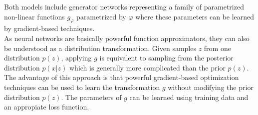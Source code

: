 
Both models include generator networks representing a family of parametrized non-linear functions $g_\varphi$ parametrized by $\varphi$ where these parameters can be learned by gradient-based techniques.\\
As neural networks are basically powerful function approximators, they can also be understood as a distribution transformation.
Given samples $z$ from one distribution $p(z)$, applying $g$ is equivalent to sampling from the posterior distribution $p(x|z)$ which is generally more complicated than the prior $p(z)$.\\


The advantage of this approach is that powerful gradient-based optimization techniques can be used to learn the transformation $g$ without modifying the prior distribution $p(z)$.
The parameters of $g$ can be learned using training data and an appropiate loss function.\\
\newpage



